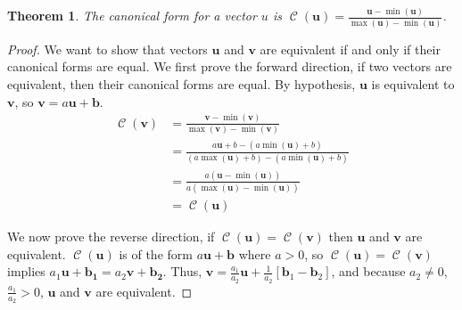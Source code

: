 \documentclass[11pt, oneside]{article}
\DeclareMathOperator{\C}{\mathcal{C}}
\renewcommand{\vec}[1]{\bm{#1}}
\theoremstyle{plain}
\newtheorem{theorem}{Theorem}[section]
\theoremstyle{definition}
\begin{document}
\begin{theorem}
  The canonical form for a vector \( u \) is \( \C(\vec{u}) =
  \frac{\vec{u} - \min(\vec{u})}{\max(\vec{u}) - \min(\vec{u})} \).
\end{theorem}
\begin{proof}
  We want to show that vectors \( \vec{u} \) and \( \vec{v} \) are equivalent
  if and only if their canonical forms are equal. We first prove the forward
  direction, if two vectors are equivalent, then their canonical forms
  are equal. By hypothesis, \( \vec{u} \) is equivalent to \( \vec{v} \),
  so \( \vec{v} = a \vec{u} + \vec{b} \). 
  \begin{align*}
    \C(\vec{v}) &= \frac{\vec{v} - \min(\vec{v})}{\max(\vec{v}) - \min(\vec{v})} \\ 
                &= \frac{a \vec{u} + b - (a \min(\vec{u}) + b)}
                {(a \max(\vec{u}) + b) - (a \min(\vec{u}) + b)} \\ 
                &= \frac{a (\vec{u} - \min(\vec{u}))}{a(\max(\vec{u}) - \min(\vec{u}))} \\
                &= \C(\vec{u})
  \end{align*}

  We now prove the reverse direction, if \( \C(\vec{u}) = \C(\vec{v}) \) then
  \( \vec{u} \) and \( \vec{v} \) are equivalent. \( \C(\vec{u}) \) is of
  the form \( a \vec{u} + \vec{b} \) where \( a > 0 \), so \( \C(\vec{u}) =
  \C(\vec{v}) \) implies \( a_1 \vec{u} + \vec{b_1} = a_2 \vec{v} + \vec{b_2}
  \). Thus, \( \vec{v} = \frac{a_1}{a_2} \vec{u} + \frac{1}{a_2} [\vec{b}_1
  - \vec{b}_2] \), and because \( a_2 \neq 0 \), \( \frac{a_1}{a_2} > 0 \),
  \( \vec{u} \) and \( \vec{v} \) are equivalent.
\end{proof}
\end{document}
